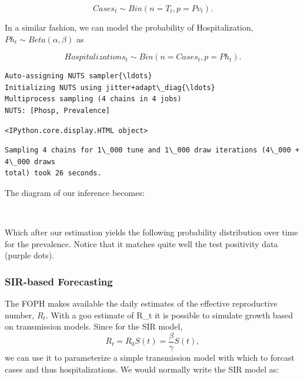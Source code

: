 \documentclass[11pt]{article}
\begin{document}
\[Cases_t \sim Bin(n=T_t, p=Pv_t).\]

In a similar fashion, we can model the probability of Hospitalization,
\(Ph_t \sim Beta (\alpha, \beta)\) as

\[Hospitalizations_t \sim Bin(n=Cases_t, p=Ph_t).\]

    \begin{Verbatim}[commandchars=\\\{\}]
Auto-assigning NUTS sampler{\ldots}
Initializing NUTS using jitter+adapt\_diag{\ldots}
Multiprocess sampling (4 chains in 4 jobs)
NUTS: [Phosp, Prevalence]
    \end{Verbatim}

    
    \begin{Verbatim}[commandchars=\\\{\}]
<IPython.core.display.HTML object>
    \end{Verbatim}

    
    \begin{Verbatim}[commandchars=\\\{\}]
Sampling 4 chains for 1\_000 tune and 1\_000 draw iterations (4\_000 + 4\_000 draws
total) took 26 seconds.
    \end{Verbatim}

    The diagram of our inference becomes:
 
            
    
    \begin{center}
    \end{center}
    { \hspace*{\fill} \\}
    

    Which after our estimation yields the following probability distribution
over time for the prevalence. Notice that it matches quite well the test
positivity data (purple dots).

    
    
    
    
    \hypertarget{sir-based-forecasting}{%
\subsubsection{SIR-based Forecasting}\label{sir-based-forecasting}}

The FOPH makes available the daily estimates of the effective
reproductive number, \(R_t\). With a goo estimate of R\_t it is possible
to simulate growth based on transmission models. Since for the SIR
model, \[R_t = R_0 S(t)= \frac{\beta}{\gamma}S(t),\] we can use it to
parameterize a simple transmission model with which to forcast cases and
thus hospitalizations. We would normally write the SIR model as:
\end{document}
